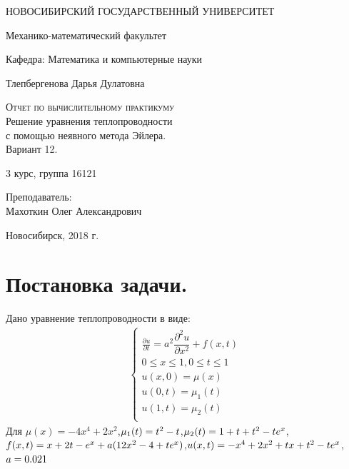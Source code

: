 \documentclass[12pt,a4paper]{scrartcl}
\begin{document}
\begin{titlepage}
  \begin{center}
     
    \vspace{0.5cm}
 
    НОВОСИБИРСКИЙ ГОСУДАРСТВЕННЫЙ УНИВЕРСИТЕТ
    \vspace{0.25cm}
     
    Механико-математический факультет
     
    Кафедра: Математика и компьютерные науки
    \vfill
     
     
    Тлепбергенова Дарья Дулатовна
    \vfill
 
    \textsc{Отчет по вычислительному практикуму}\\[5mm]
     
    {\LARGE Решение уравнения теплопроводности\\
      с помощью неявного метода Эйлера.\\
    Вариант 12.\\[2mm]}
  \bigskip
     
    3 курс, группа 16121
\end{center}
\vfill
 \newlength{\ML}
\hfill\begin{minipage}{0.4\textwidth}
  Преподаватель:\\
  Махоткин Олег Александрович
\end{minipage}%
\bigskip

 \vfill
\begin{center}
  Новосибирск, 2018 г.
\end{center}
\end{titlepage}

\newpage
\section{Постановка задачи.}
Дано уравнение теплопроводности в виде:
\begin{align}\label{main}
    \begin{cases}
        \frac{\partial u}{\partial t} = a^{2}
        {\dfrac{{\partial}^2 u}{\partial x^{2}}}+f(x,t) \\
        0\le x \le 1, 0\le t \le1 \\
        u(x,0) = \mu(x) \\
        u(0,t) = \mu_1(t) \\
        u(1,t) = \mu_2(t) \\
    \end{cases}
\end{align}
Для $\mu(x) = -4x^{4}+2x^{2}$,$ \\
    \mu_1(t) = t^{2}-t$,$ \\
    \mu_2(t) = 1+t+t^{2}-t e^{x}$,$ \\
    f(x,t) = x+2 t-e^{x}+a(12 x^{2}-4+t e^{x}) $,$\\
    u(x,t) = -x^{4}+2 x^{2}+t x+t^{2}-t e^{x} $,$\\
    a = 0.021 $\\
\end{document}
